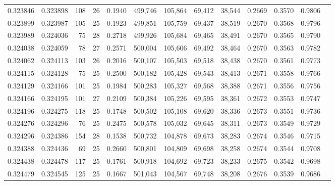 \begin{tabular}{rrrrrrrrrrrrr}
0.323846 & 0.323898 &   108 &  26 &                                     0.1940 & 499,746 & 105,864 &  69,412 &  38,544 & 0.2669 & 0.3570 & 0.9806 \\
0.323899 & 0.323987 &   105 &  25 &                                     0.1923 & 499,851 & 105,759 &  69,437 &  38,519 & 0.2670 & 0.3568 & 0.9796 \\
0.323989 & 0.324036 &    75 &  28 &                                     0.2718 & 499,926 & 105,684 &  69,465 &  38,491 & 0.2670 & 0.3565 & 0.9790 \\
0.324038 & 0.324059 &    78 &  27 &                                     0.2571 & 500,004 & 105,606 &  69,492 &  38,464 & 0.2670 & 0.3563 & 0.9782 \\
0.324062 & 0.324113 &   103 &  26 &                                     0.2016 & 500,107 & 105,503 &  69,518 &  38,438 & 0.2670 & 0.3561 & 0.9773 \\
0.324115 & 0.324128 &    75 &  25 &                                     0.2500 & 500,182 & 105,428 &  69,543 &  38,413 & 0.2671 & 0.3558 & 0.9766 \\
0.324129 & 0.324166 &   101 &  25 &                                     0.1984 & 500,283 & 105,327 &  69,568 &  38,388 & 0.2671 & 0.3556 & 0.9756 \\
0.324166 & 0.324195 &   101 &  27 &                                     0.2109 & 500,384 & 105,226 &  69,595 &  38,361 & 0.2672 & 0.3553 & 0.9747 \\
0.324196 & 0.324275 &   118 &  25 &                                     0.1748 & 500,502 & 105,108 &  69,620 &  38,336 & 0.2673 & 0.3551 & 0.9736 \\
0.324276 & 0.324296 &    76 &  25 &                                     0.2475 & 500,578 & 105,032 &  69,645 &  38,311 & 0.2673 & 0.3549 & 0.9729 \\
0.324296 & 0.324386 &   154 &  28 &                                     0.1538 & 500,732 & 104,878 &  69,673 &  38,283 & 0.2674 & 0.3546 & 0.9715 \\
0.324388 & 0.324436 &    69 &  25 &                                     0.2660 & 500,801 & 104,809 &  69,698 &  38,258 & 0.2674 & 0.3544 & 0.9708 \\
0.324438 & 0.324478 &   117 &  25 &                                     0.1761 & 500,918 & 104,692 &  69,723 &  38,233 & 0.2675 & 0.3542 & 0.9698 \\
0.324479 & 0.324545 &   125 &  25 &                                     0.1667 & 501,043 & 104,567 &  69,748 &  38,208 & 0.2676 & 0.3539 & 0.9686 \\

\end{tabular}
